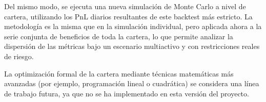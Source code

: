 Del mismo modo, se ejecuta una nueva simulación de Monte Carlo a nivel de cartera, utilizando los PnL diarios resultantes de este backtest más estricto. La metodología es la misma que en la simulación individual, pero aplicada ahora a la serie conjunta de beneficios de toda la cartera, lo que permite analizar la dispersión de las métricas bajo un escenario multiactivo y con restricciones reales de riesgo.

La optimización formal de la cartera mediante técnicas matemáticas más avanzadas (por ejemplo, programación lineal o cuadrática) se considera una línea de trabajo futura, ya que no se ha implementado en esta versión del proyecto.











